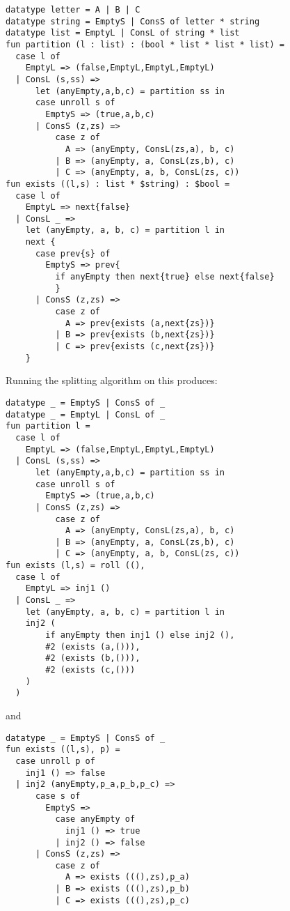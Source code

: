 \begin{lstlisting} 
datatype letter = A | B | C
datatype string = EmptyS | ConsS of letter * string
datatype list = EmptyL | ConsL of string * list
fun partition (l : list) : (bool * list * list * list) =
  case l of
    EmptyL => (false,EmptyL,EmptyL,EmptyL)
  | ConsL (s,ss) =>
      let (anyEmpty,a,b,c) = partition ss in
      case unroll s of
        EmptyS => (true,a,b,c)
      | ConsS (z,zs) =>
          case z of 
            A => (anyEmpty, ConsL(zs,a), b, c) 
          | B => (anyEmpty, a, ConsL(zs,b), c) 
          | C => (anyEmpty, a, b, ConsL(zs, c))
fun exists ((l,s) : list * $string) : $bool =
  case l of 
    EmptyL => next{false} 
  | ConsL _ => 
    let (anyEmpty, a, b, c) = partition l in
    next {
      case prev{s} of
        EmptyS => prev{
          if anyEmpty then next{true} else next{false}
          }
      | ConsS (z,zs) =>
          case z of
            A => prev{exists (a,next{zs})}
          | B => prev{exists (b,next{zs})} 
          | C => prev{exists (c,next{zs})}
    }
\end{lstlisting}
Running the splitting algorithm on this produces:

\begin{lstlisting} 
datatype _ = EmptyS | ConsS of _
datatype _ = EmptyL | ConsL of _
fun partition l =
  case l of
    EmptyL => (false,EmptyL,EmptyL,EmptyL)
  | ConsL (s,ss) =>
      let (anyEmpty,a,b,c) = partition ss in
      case unroll s of
        EmptyS => (true,a,b,c)
      | ConsS (z,zs) =>
          case z of 
            A => (anyEmpty, ConsL(zs,a), b, c) 
          | B => (anyEmpty, a, ConsL(zs,b), c) 
          | C => (anyEmpty, a, b, ConsL(zs, c))
fun exists (l,s) = roll ((), 
  case l of 
    EmptyL => inj1 ()
  | ConsL _ => 
    let (anyEmpty, a, b, c) = partition l in
    inj2 (
    	if anyEmpty then inj1 () else inj2 (), 
    	#2 (exists (a,())), 
    	#2 (exists (b,())), 
    	#2 (exists (c,()))
    )
  )
\end{lstlisting}
and 
\begin{lstlisting} 
datatype _ = EmptyS | ConsS of _
fun exists ((l,s), p) =
  case unroll p of 
    inj1 () => false
  | inj2 (anyEmpty,p_a,p_b,p_c) => 
      case s of
        EmptyS => 
          case anyEmpty of 
            inj1 () => true 
          | inj2 () => false
      | ConsS (z,zs) =>
          case z of
            A => exists (((),zs),p_a)
          | B => exists (((),zs),p_b)
          | C => exists (((),zs),p_c)
\end{lstlisting}

